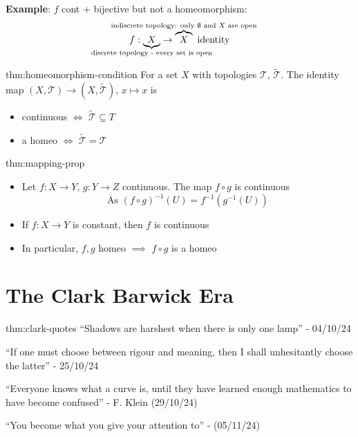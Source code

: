 \documentclass{article}
\begin{document}
\textbf{Example}: $f$ cont + bijective but not a homeomorphism:
\[f : \underbrace{X}_{\mathclap{\text{discrete topology - every set is open}}} \to \overbrace{X}^{\mathclap{\text{indiscrete topology: only $\emptyset$ and $X$ are open}}} \text{ identity}\]

\begin{lma}{thm:homeomorphism-condition}{}
    For a set $X$ with topologies $\mathcal{T},\,\tilde{\mathcal{T}}$. The identity map $(X, \mathcal{T})\to (X, \tilde{\mathcal{T}}),\,x \mapsto x$ is
    \begin{itemize}
        \item continuous $\iff$ $\tilde{\mathcal{T}} \subseteq T$
        \item a homeo $\iff$ $\tilde{\mathcal{T}} = \mathcal{T}$
    \end{itemize}
\end{lma}

\begin{thm}{thm:mapping-prop}{}
    \begin{itemize}
        \item Let $f : X \to Y,\,g : Y \to Z$ continuous. The map $f \circ g$ is continuous
            \[\text{As } (f \circ g)^{-1}(U) = f^{-1}(g^{-1}(U))\]
        \item If $f : X \to Y$ is constant, then $f$ is continuous
        \item In particular, $f, g$ homeo $\implies$ $f \circ g$ is a homeo
    \end{itemize}
\end{thm}

\newpage

\section{The Clark Barwick Era}

\begin{thm}{thm:clark-quotes}{}
    ``Shadows are harshest when there is only one lamp'' - 04/10/24

    ``If one must choose between rigour and meaning, then I shall unhesitantly choose the latter'' - 25/10/24

    ``Everyone knows what a curve is, until they have learned enough mathematics to have become confused'' - F. Klein (29/10/24)

    ``You become what you give your attention to'' - (05/11/24)
\end{thm}
\end{document}
